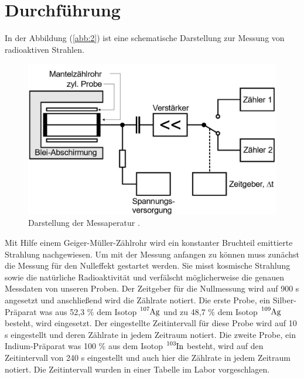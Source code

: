 \section{Durchführung}
In der Abbildung (\ref{abb:2}) ist eine schematische Darstellung zur Messung von radioaktiven
Strahlen.
\begin{figure}[H]
  \centering
  \includegraphics[width=\textwidth]{content/Aufbau.png}
  \caption{Darstellung der Messaperatur \cite{1}.}
\end{figure}
Mit Hilfe einem Geiger-Müller-Zählrohr wird ein konstanter Bruchteil emittierte Strahlung nachgewiesen.
Um mit der Messung anfangen zu können muss zunächst die Messung für den Nulleffekt gestartet werden.
Sie misst kosmische Strahlung sowie die natürliche Radioaktivität und verfälscht möglicherweise die genauen
Messdaten von unseren Proben.
Der Zeitgeber für die Nullmessung wird auf 900 s angesetzt und anschließend wird die Zählrate notiert.
Die erste Probe, ein Silber-Präparat was aus 52,3 \% dem Isotop $\ce{^{107}_{}Ag}$ und zu 48,7 \% dem Isotop $\ce{^{109}_{}Ag}$ besteht, wird eingesetzt.
Der eingestellte Zeitintervall für diese Probe wird
auf 10 s eingestellt und deren Zählrate in jedem Zeitraum notiert.  Die zweite Probe, ein Indium-Präparat was 100 \% aus dem Isotop $\ce{^{103}_{}In}$ besteht,
wird auf den Zeitintervall von 240 s eingestellt und auch hier die Zählrate in jedem Zeitraum notiert.
Die Zeitintervall wurden in einer Tabelle im Labor vorgeschlagen.



